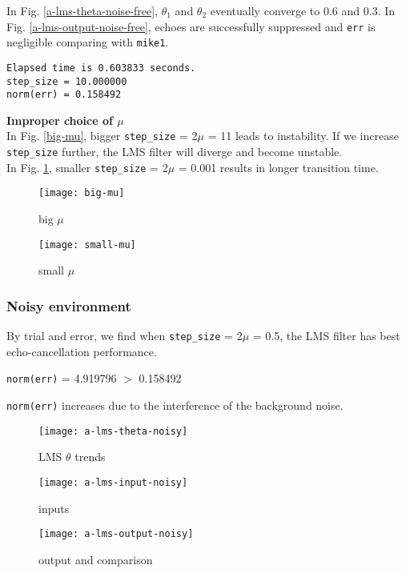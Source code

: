 \documentclass{article}
\begin{document}
In Fig. \ref{a-lms-theta-noise-free}, $\theta_1$ and $\theta_2$ eventually converge to 0.6 and 0.3. In Fig. \ref{a-lms-output-noise-free}, echoes are successfully suppressed and \texttt{err} is negligible comparing with \texttt{mike1}.

\begin{lstlisting}[language={}]
Elapsed time is 0.603833 seconds.
step_size = 10.000000
norm(err) = 0.158492
\end{lstlisting}

\textbf{Improper choice of $\mu$}\\

In Fig. \ref{big-mu}, bigger \texttt{step\_size} = 2$\mu$ = 11 leads to instability. If we increase \texttt{step\_size} further, the LMS filter will diverge and become unstable.\\

In Fig. \ref{small-mu}, smaller \texttt{step\_size} = 2$\mu$ = 0.001 results in longer transition time.

\begin{figure}[H]
\begin{minipage}[t]{0.5\linewidth}
\centering
\texttt{[image: big-mu]}
\caption{big $\mu$}
\label{big-mu}
\end{minipage}
\begin{minipage}[t]{0.5\linewidth}
\centering
\texttt{[image: small-mu]}
\caption{small $\mu$}
\label{small-mu}
\end{minipage}
\end{figure}


\subsubsection*{Noisy environment}

By trial and error, we find when \texttt{step\_size} = 2$\mu$ = 0.5, the LMS filter has best echo-cancellation performance.
\begin{center}
\texttt{norm(err)} = 4.919796 $>$ 0.158492
\end{center}
\texttt{norm(err)} increases due to the interference of the background noise.

\begin{figure}[H]
\begin{minipage}[t]{0.33\linewidth}
\centering
\texttt{[image: a-lms-theta-noisy]}
\caption{LMS $\theta$ trends}
\label{a-lms-theta-noisy}
\end{minipage}
\begin{minipage}[t]{0.33\linewidth}
\centering
\texttt{[image: a-lms-input-noisy]}
\caption{inputs}
\end{minipage}
\begin{minipage}[t]{0.33\linewidth}
\centering
\texttt{[image: a-lms-output-noisy]}
\caption{output and comparison}
\label{a-lms-output-noisy}
\end{minipage}
\end{figure}
\end{document}
